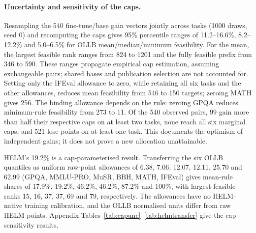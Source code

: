 \documentclass{article}
\begin{document}
\paragraph{Uncertainty and sensitivity of the caps.}
Resampling the 540 fine-tune/base gain vectors jointly across tasks (1000 draws, seed 0) and recomputing the caps gives 95\% percentile ranges of 11.2--16.6\%, 8.2--12.2\% and 5.0--6.5\% for OLLB mean/median/minimum feasibility. For the mean, the largest feasible rank ranges from 824 to 1201 and the fully feasible prefix from 346 to 590. These ranges propagate empirical cap estimation, assuming exchangeable pairs; shared bases and publication selection are not accounted for. Setting only the IFEval allowance to zero, while retaining all six tasks and the other allowances, reduces mean feasibility from 546 to 150 targets; zeroing MATH gives 256. The binding allowance depends on the rule: zeroing GPQA reduces minimum-rule feasibility from 273 to 11. Of the 540 observed pairs, 99 gain more than half their respective caps on at least two tasks, none reach all six marginal caps, and 521 lose points on at least one task. This documents the optimism of independent gains; it does not prove a new allocation unattainable.

HELM's 19.2\% is a cap-parameterised result. Transferring the six OLLB quantiles as uniform raw-point allowances of 6.38, 7.06, 12.07, 12.11, 25.70 and 62.99 (GPQA, MMLU-PRO, MuSR, BBH, MATH, IFEval) gives mean-rule shares of 17.9\%, 19.2\%, 46.2\%, 46.2\%, 87.2\% and 100\%, with largest feasible ranks 15, 16, 37, 37, 69 and 79, respectively. The allowances have no HELM-native training calibration, and the OLLB normalised units differ from raw HELM points. Appendix Tables~\ref{tab:capunc}--\ref{tab:helmtransfer} give the cap sensitivity results.

\begin{table}[t]
\caption{Feasibility frontier under the primary cap (\texttt{emp99} on OLLB, \texttt{emp99T} on HELM) and the oracle cap (\texttt{ceil}). \emph{share}: fraction of targets for which first place is reachable (Wilson 95\% intervals); $r^*$: largest rank under the mean among feasible targets (may be an isolated case); \emph{all feas.\ up to}: largest $r$ such that every target of rank $\le r$ is feasible; \emph{first bin $<$ 1/2}: first rank bin (bins double from rank 2) in which fewer than half are feasible. $^\dagger$: targets at ranks 2--50 under the mean only, not comparable with the score rules' fractions. Generated by \texttt{figures/src/tables.py}.}
\label{tab:T4}
\centering\scriptsize
\\[4pt]

\end{table}
\end{document}
